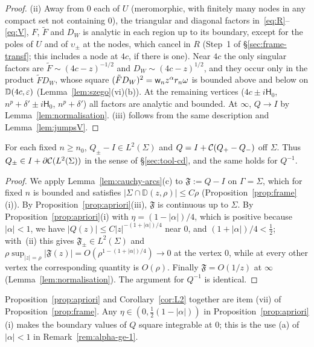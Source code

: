 \begin{proof}
(ii) Away from $0$ each of $U$ (meromorphic, with finitely many nodes in any compact set not containing $0$), the triangular
and diagonal factors in~\eqref{eq:R}--\eqref{eq:V}, $F$, $\tilde F$ and $D_W$ is analytic in each region up to its boundary, except
for the poles of $U$ and of $\upsilon_\pm$ at the nodes, which cancel in $R$ (Step~1 of \S\ref{sec:frame-transf}; this includes a node at $4c$, if there is one). Near $4c$ the
only singular factors are $\tilde F\sim(4c-z)^{-1/2}$ and $D_W\sim(4c-z)^{1/2}$, and they occur only in the product
$\tilde FD_W$, whose square $(\tilde FD_W)^2=\mathsf w_n z^\alpha r_n\omega$ is bounded above and below on $\mathbb D(4c,\varepsilon)$
(Lemma~\ref{lem:szego}(vi)(b)). At the remaining vertices ($4c\pm i\mathsf H_0$, $n^p+\delta'\pm i\mathsf H_0$, $n^p+\delta'$) all factors are
analytic and bounded. At $\infty$, $Q\to I$ by Lemma~\ref{lem:normalisation}. (iii) follows from the same description and
Lemma~\ref{lem:jumpsV}.
\end{proof}

\begin{corollary}\label{cor:L2}
For each fixed $n\ge n_0$, $Q_\pm-I\in L^2(\Sigma)$ and $Q=I+\mathcal{C}(Q_+-Q_-)$ off $\Sigma$. Thus $Q_\pm\in I+\partial\mathcal{C}(L^2(\Sigma))$ in
the sense of \S\ref{sec:tool-cd}, and the same holds for $Q^{-1}$.
\end{corollary}

\begin{proof}
We apply Lemma~\ref{lem:cauchy-arcs}(c) to $\mathfrak F:=Q-I$ on $\Gamma=\Sigma$, which for fixed $n$ is bounded and satisfies
$|\Sigma\cap \mathbb D(z,\rho)|\le C\rho$ (Proposition~\ref{prop:frame}(i)). By Proposition~\ref{prop:apriori}(iii), $\mathfrak F$ is continuous up to $\Sigma$. By
Proposition~\ref{prop:apriori}(i) with $\eta=(1-|\alpha|)/4$, which is positive because $|\alpha|<1$, we have
$|Q(z)|\le C|z|^{-(1+|\alpha|)/4}$ near $0$, and $(1+|\alpha|)/4<\frac12$; with~(ii) this gives $\mathfrak F_\pm\in L^2(\Sigma)$ and
$\rho\sup_{|z|=\rho}|\mathfrak F(z)|=O(\rho^{1-(1+|\alpha|)/4})\to0$ at the vertex $0$, while at every other vertex the
corresponding quantity is $O(\rho)$. Finally $\mathfrak F=O(1/z)$ at $\infty$ (Lemma~\ref{lem:normalisation}). The argument for
$Q^{-1}$ is identical.
\end{proof}

\noindent Proposition~\ref{prop:apriori} and Corollary~\ref{cor:L2} together are item (vii) of
Proposition~\ref{prop:frame}. Any $\eta\in(0,\frac12(1-|\alpha|))$ in Proposition~\ref{prop:apriori}(i) makes the
boundary values of $Q$ square integrable at $0$; this is the use (a) of $|\alpha|<1$ in Remark~\ref{rem:alpha-ge-1}.
